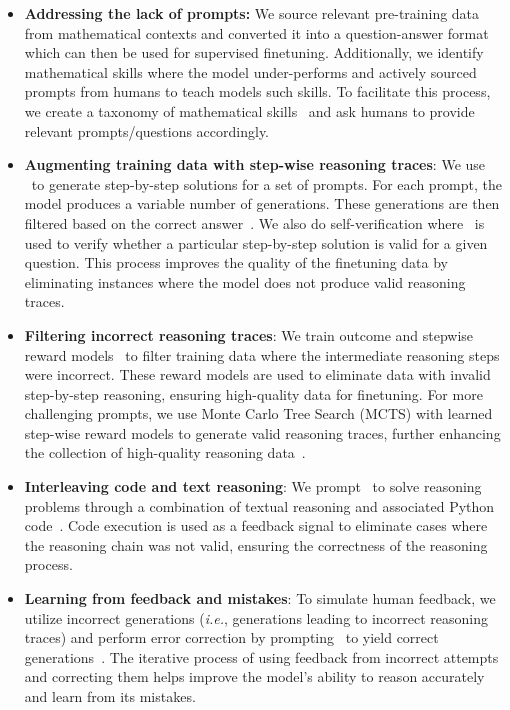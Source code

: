 \begin{itemize}
    \item \textbf{Addressing the lack of prompts:} We source relevant pre-training data from mathematical contexts and converted it into a question-answer format which can then be used for supervised finetuning. Additionally, we identify mathematical skills where the model under-performs and actively sourced prompts from humans to teach models such skills. To facilitate this process, we create a taxonomy of mathematical skills~\citep{didolkar2024metacognitive} and ask humans to provide relevant prompts/questions accordingly.
    \item \textbf{Augmenting training data with step-wise reasoning traces}: We use \llamathree~to generate step-by-step solutions for a set of prompts. For each prompt, the model produces a variable number of generations. These generations are then filtered based on the correct answer~\citep{li2024common}. We also do self-verification where \llamathree~is used to verify whether a particular step-by-step solution is valid for a given question. This process improves the quality of the finetuning data by eliminating instances where the model does not produce valid reasoning traces.
    \item \textbf{Filtering incorrect reasoning traces}:  We train outcome and stepwise reward models~\citep{lightman2023let, wang2023math} to filter training data where the intermediate reasoning steps were incorrect. These reward models are used to eliminate data with invalid step-by-step reasoning, ensuring high-quality data for finetuning. For more challenging prompts, we use Monte Carlo Tree Search (MCTS) with learned step-wise reward models to generate valid reasoning traces, further enhancing the collection of high-quality reasoning data~\citep{xie2024monte}.
    \item \textbf{Interleaving code and text reasoning}:  We prompt \llamathree~to solve reasoning problems through a combination of textual reasoning and associated Python code~\citep{gou2023tora}. Code execution is used as a feedback signal to eliminate cases where the reasoning chain was not valid, ensuring the correctness of the reasoning process.
    \item \textbf{Learning from feedback and mistakes}: To simulate human feedback, we utilize incorrect generations (\emph{i.e.}, generations leading to incorrect reasoning traces) and perform error correction by prompting \llamathree~to yield correct generations~\citep{an2023learning, welleck2022generating, madaan2024self}. The iterative process of using feedback from incorrect attempts and correcting them helps improve the model's ability to reason accurately and learn from its mistakes.
\end{itemize}


